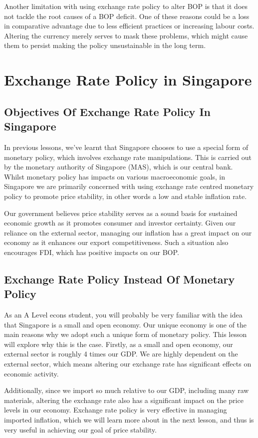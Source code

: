 \documentclass[DIV=classic,11pt,numbers=noenddot,parskip]{scrartcl}
\begin{document}
Another limitation with using exchange rate policy to alter BOP is that it does not tackle the root causes of a BOP deficit. One of these reasons could be a loss in comparative advantage due to less efficient practices or increasing labour costs. Altering the currency merely serves to mask these problems, which might cause them to persist making the policy unsustainable in the long term.
\newpage
\section{Exchange Rate Policy in Singapore}
\subsection{Objectives Of Exchange Rate Policy In Singapore}
In previous lessons, we’ve learnt that Singapore chooses to use a special form of monetary policy, which involves exchange rate manipulations. This is carried out by the monetary authority of Singapore (MAS), which is our central bank. Whilst monetary policy has impacts on various macroeconomic goals, in Singapore we are primarily concerned with using exchange rate centred monetary policy to promote price stability, in other words a low and stable inflation rate.

Our government believes price stability serves as a sound basis for sustained economic growth as it promotes consumer and investor certainty. Given our reliance on the external sector, managing our inflation has a great impact on our economy as it enhances our export competitiveness. Such a situation also encourages FDI, which has positive impacts on our BOP.
\subsection{Exchange Rate Policy Instead Of Monetary Policy}
As an A Level econs student, you will probably be very familiar with the idea that Singapore is a small and open economy. Our unique economy is one of the main reasons why we adopt such a unique form of monetary policy. This lesson will explore why this is the case.
Firstly, as a small and open economy, our external sector is roughly 4 times our GDP. We are highly dependent on the external sector, which means altering our exchange rate has significant effects on economic activity.

Additionally, since we import so much relative to our GDP, including many raw materials, altering the exchange rate also has a significant impact on the price levels in our economy. Exchange rate policy is very effective in managing imported inflation, which we will learn more about in the next lesson, and thus is very useful in achieving our goal of price stability.
\end{document}

